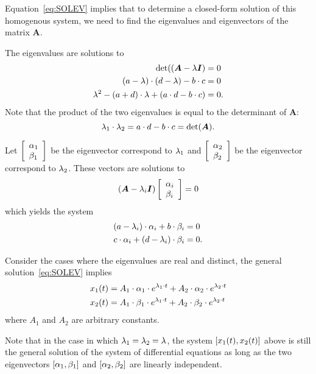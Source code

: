 \documentclass[letterpaper,12pt,leqno]{article}
\begin{document}
Equation~\eqref{eq:SOLEV} implies that to determine a closed-form solution of this homogenous system, we need to find the eigenvalues and eigenvectors of the matrix $\bm{A}$.

The eigenvalues are solutions to 
\begin{align*}
\det( \left( \bm{A}-\lambda \bm{I} \right) &=0\\
\left( a-\lambda \right) \cdot \left( d-\lambda \right) -b\cdot c &=0 \\
\lambda ^{2}-\left( a+d \right)\cdot  \lambda +\left( a\cdot d-b\cdot c \right) &=0.
\end{align*}
Note that the product of the two eigenvalues is equal to the determinant of $
\bm{A}$:
\begin{equation}
\lambda_{1}\cdot \lambda_{2}=a\cdot d-b\cdot c=\det(\bm{A}).\label{eq:DETL}
\end{equation}

Let $\left[ 
\begin{array}{l}
\alpha_{1} \\ 
\beta_{1}
\end{array}
 \right] $ be the eigenvector correspond to $\lambda_{1}$ and $\left[ 
\begin{array}{l}
\alpha_{2} \\ 
\beta_{2}
\end{array} \right] $ be the eigenvector correspond to $\lambda_{2}$. These vectors are solutions to 
\begin{equation*}
\left( \bm{A}-\lambda_{i}\bm{I} \right) \left[ 
\begin{array}{l}
\alpha_{i} \\ 
\beta_{i}
\end{array} \right] =0
\end{equation*}
which yields the system
\begin{align*}
\left( a-\lambda_{i} \right)\cdot  \alpha_{i}+b\cdot \beta _{i} &=0 \\
c\cdot \alpha_{i}+\left( d-\lambda_{i} \right)\cdot  \beta _{i} &=0.
\end{align*}

Consider the cases where the eigenvalues are real and distinct, the general
solution~\eqref{eq:SOLEV} implies
\begin{align*}
x_{1}(t) &=A_{1}\cdot \alpha_{1}\cdot e^{\lambda_{1}\cdot t}+A_{2}\cdot \alpha_{2}\cdot e^{\lambda_{2}\cdot t}\\
x_{2}(t) &=A_{1}\cdot \beta_{1}\cdot e^{\lambda_{1}\cdot t}+A_{2}\cdot \beta_{2}\cdot e^{\lambda_{2}\cdot t} 
\end{align*}
where $A_{1}$ and $A_{2}$ are arbitrary constants. 

Note that in the case in which $\lambda_{1}=\lambda_{2}=\lambda$, the system $\left[ x_{1}(t),x_{2}(t) \right]$ above is still the general solution of the system of differential equations as long as the two eigenvectors $\left[ \alpha_{1},\beta_{1} \right]$ and $\left[ \alpha_{2},\beta_{2} \right]$ are linearly independent.
\end{document}
